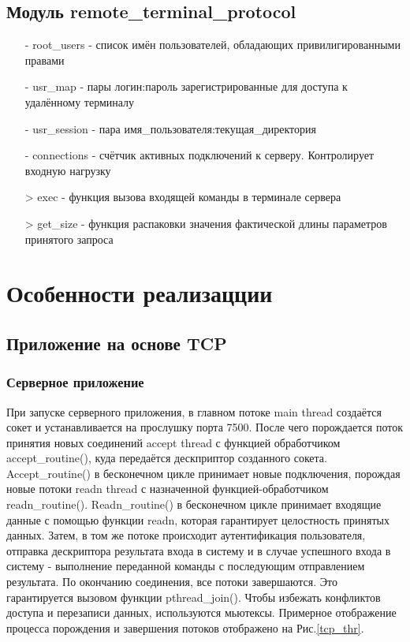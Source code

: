\subsection{Модуль remote_terminal_protocol}
\begin{itemize}
\item[-] root_users - список имён пользователей, обладающих привилигированными правами
\item[-] usr_map - пары логин:пароль зарегистрированные для доступа к удалённому терминалу
\item[-] usr_session - пара имя_пользователя:текущая_директория
\item[-] connections - счётчик активных подключений к серверу. Контролирует входную нагрузку 
\item[>] exec - функция вызова входящей команды в терминале сервера
\item[>] get_size - функция распаковки значения фактической длины параметров принятого запроса
\end{itemize}

\section{Особенности реализацции}

\subsection{Приложение на основе TCP}

\subsubsection{Серверное приложение}

При запуске серверного приложения, в главном потоке main thread создаётся сокет и устанавливается на прослушку порта 7500. После чего порождается поток принятия новых соединений accept thread с функцией обработчиком accept_routine(), куда передаётся дескприптор созданного сокета. Accept_routine() в бесконечном цикле принимает новые подключения, порождая новые потоки readn thread  с назначенной функцией-обработчиком readn_routine(). Readn_routine() в бесконечном цикле принимает входящие данные с помощью функции readn, которая гарантирует целостность принятых данных. Затем, в том же потоке  происходит аутентификация пользователя, отправка дескриптора результата входа в систему и в случае успешного входа в систему - выполнение переданной команды с последующим отправлением результата. По окончанию соединения, все потоки завершаются. Это гарантируется вызовом функции pthread_join(). Чтобы избежать конфликтов доступа и перезаписи данных, используются мьютексы. Примерное отображение процесса порождения и завершения потоков отображено на Рис.\ref{tcp_thr}.

